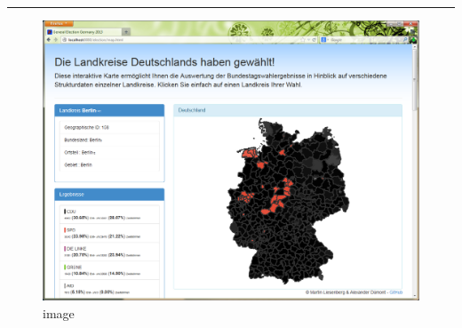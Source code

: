 \begin{center}\rule{3in}{0.4pt}\end{center}

\begin{figure}[htbp]
\centering
\includegraphics[width=1.2\textwidth]{../img/JKGj20F.png}
\caption{image}
\end{figure}